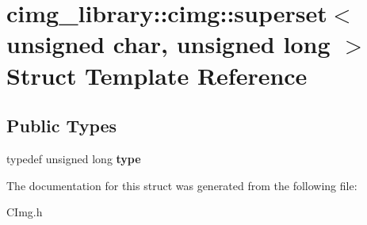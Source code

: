 \hypertarget{structcimg__library_1_1cimg_1_1superset_3_01unsigned_01char_00_01unsigned_01long_01_4}{\section{cimg\-\_\-library\-:\-:cimg\-:\-:superset$<$ unsigned char, unsigned long $>$ Struct Template Reference}
\label{structcimg__library_1_1cimg_1_1superset_3_01unsigned_01char_00_01unsigned_01long_01_4}
}
\subsection*{Public Types}
\begin{DoxyCompactItemize}
\item 
\hypertarget{structcimg__library_1_1cimg_1_1superset_3_01unsigned_01char_00_01unsigned_01long_01_4_a2c7a4bf96d56a05e1fd57c517c6e998e}{typedef unsigned long {\bfseries type}}\label{structcimg__library_1_1cimg_1_1superset_3_01unsigned_01char_00_01unsigned_01long_01_4_a2c7a4bf96d56a05e1fd57c517c6e998e}

\end{DoxyCompactItemize}


The documentation for this struct was generated from the following file\-:\begin{DoxyCompactItemize}
\item 
C\-Img.\-h\end{DoxyCompactItemize}
